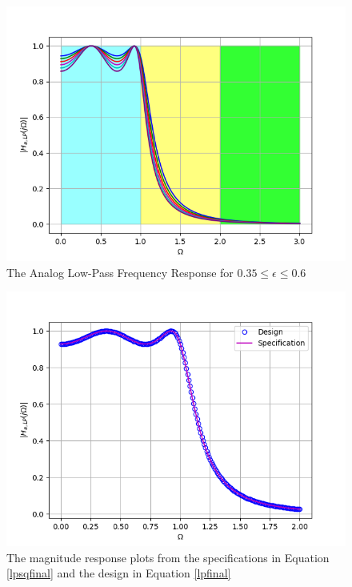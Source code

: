 \documentclass[article]{IEEEtran}
\theoremstyle{remark}
\numberwithin{equation}{subsection}
\begin{document}
\begin{figure}[!ht]
\centering
\includegraphics[width = \columnwidth]{figs/fig1.png}
\caption{The Analog Low-Pass Frequency Response for $0.35 \leq \epsilon \leq 0.6$}
\label{fig1}
\end{figure}

\begin{figure}[!ht]
\centering
\includegraphics[width =\columnwidth]{figs/fig2.png}
\caption{The magnitude response plots from the specifications in Equation \ref{lpsqfinal} and the design in Equation \ref{lpfinal}}
\label{fig2}
\end{figure}
\end{document}
